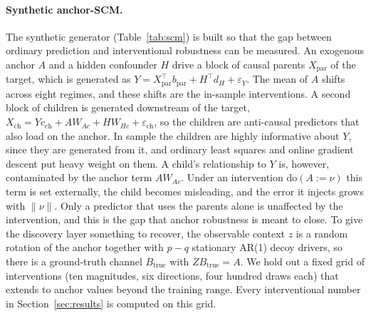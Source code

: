 \documentclass[11pt]{article}
\theoremstyle{plain}
\theoremstyle{remark}
\newcommand{\doop}{\mathrm{do}}
\begin{document}
\paragraph{Synthetic anchor-SCM.}
The synthetic generator (Table~\ref{tab:scm}) is built so that the gap between
ordinary prediction and interventional robustness can be measured. An exogenous anchor
$A$ and a hidden confounder $H$ drive a block of causal parents $X_{\mathrm{par}}$ of
the target, which is generated as $Y=X_{\mathrm{par}}^\top b_{\mathrm{par}}+H^\top d_H+
\varepsilon_Y$. The mean of $A$ shifts across eight regimes, and these shifts are the
in-sample interventions. A second block of children is generated downstream of the
target, $X_{\mathrm{ch}}=Yc_{\mathrm{ch}}+AW_{Ac}+HW_{Hc}+\varepsilon_{\mathrm{ch}}$,
so the children are anti-causal predictors that also load on the anchor. In sample the
children are highly informative about $Y$, since they are generated from it, and
ordinary least squares and online gradient descent put heavy weight on them. A child's
relationship to $Y$ is, however, contaminated by the anchor term $AW_{Ac}$. Under an
intervention $\doop(A:=\nu)$ this term is set externally, the child becomes misleading,
and the error it injects grows with $\|\nu\|$. Only a predictor that uses the parents
alone is unaffected by the intervention, and this is the gap that anchor robustness is
meant to close. To give the discovery layer something to recover, the observable
context $z$ is a random rotation of the anchor together with $p-q$ stationary AR(1)
decoy drivers, so there is a ground-truth channel $B_{\text{true}}$ with
$ZB_{\text{true}}=A$. We hold out a fixed grid of interventions (ten magnitudes, six
directions, four hundred draws each) that extends to anchor values beyond the training
range. Every interventional number in Section~\ref{sec:results} is computed on this
grid.
\end{document}
